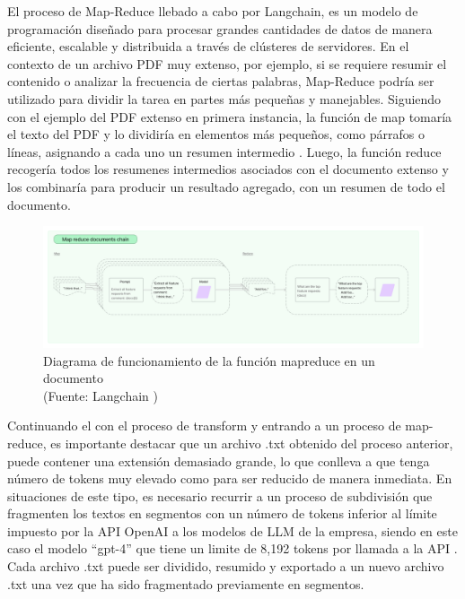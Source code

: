 \par El proceso de Map-Reduce llebado a cabo por Langchain, es un modelo de programación diseñado para procesar grandes cantidades de datos de manera eficiente, 
escalable y distribuida a través de clústeres de servidores. En el contexto de un archivo PDF muy extenso, por ejemplo, si se requiere resumir 
el contenido o analizar la frecuencia de ciertas palabras, Map-Reduce podría ser utilizado para dividir la tarea en partes más pequeñas y manejables. Siguiendo con el ejemplo del PDF extenso
en primera instancia, la función de map tomaría el texto del PDF y lo dividiría en elementos más pequeños, como párrafos o líneas, 
asignando a cada uno un resumen intermedio \cite{mapreduce}. Luego, la función reduce recogería todos los resumenes intermedios asociados con el documento extenso
y los combinaría para producir un resultado agregado, con un resumen de todo el documento. 

\begin{figure}[ht!]
    \centering
    \includegraphics[width=1\textwidth]{figures/huemul_mapreduce.jpg}
    \caption[Diagrama de funcionamiento de la función mapreduce en un documento]{Diagrama de funcionamiento de la función mapreduce en un documento\\
    {\scriptsize (Fuente: Langchain \cite{framework1})}}
    \label{fig:chatbot1}
\end{figure}

\par Continuando el con el proceso de transform y entrando a un proceso de map-reduce, es importante destacar que un archivo .txt obtenido del proceso anterior, 
puede contener una extensión demasiado grande, lo que conlleva a que tenga número de tokens muy elevado como para ser reducido de manera inmediata. 
En situaciones de este tipo, es necesario recurrir a un proceso de subdivisión que fragmenten los textos en segmentos con un número de tokens inferior al límite impuesto por 
la API OpenAI a los modelos de LLM de la empresa, siendo en este caso el modelo ``gpt-4'' que tiene un limite de 8,192 tokens por llamada a la API \cite{openaimodels}.
Cada archivo .txt puede ser dividido, resumido y exportado a un nuevo archivo .txt una vez que ha sido fragmentado previamente en segmentos.

